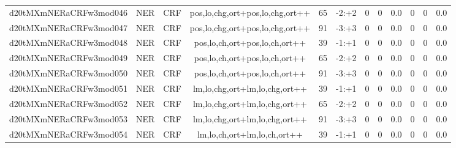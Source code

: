 \documentclass[a4paper]{article}
\begin{document}
\begin{landscape}
\begin{center}
\begin{tabular}{ |c|c|c|c|c|c|c|c|c|c|c|c|}
 
 	
 	\small{ d20tMXmNERaCRFw3mod046 } & \small{ NER} & \small{  CRF }  & pos,lo,chg,ort+pos,lo,chg,ort++  &  65 &  \small{  -2:+2 }  &  0 & 0 & 0.0  &  0 & 0 & 0.0 \\
 	

 
 	
 	\small{ d20tMXmNERaCRFw3mod047 } & \small{ NER} & \small{  CRF }  & pos,lo,chg,ort+pos,lo,chg,ort++  &  91 &  \small{  -3:+3 }  &  0 & 0 & 0.0  &  0 & 0 & 0.0 \\
 	

 
 	
 	\small{ d20tMXmNERaCRFw3mod048 } & \small{ NER} & \small{  CRF }  & pos,lo,ch,ort+pos,lo,ch,ort++  &  39 &  \small{  -1:+1 }  &  0 & 0 & 0.0  &  0 & 0 & 0.0 \\
 	

 
 	
 	\small{ d20tMXmNERaCRFw3mod049 } & \small{ NER} & \small{  CRF }  & pos,lo,ch,ort+pos,lo,ch,ort++  &  65 &  \small{  -2:+2 }  &  0 & 0 & 0.0  &  0 & 0 & 0.0 \\
 	

 
 	
 	\small{ d20tMXmNERaCRFw3mod050 } & \small{ NER} & \small{  CRF }  & pos,lo,ch,ort+pos,lo,ch,ort++  &  91 &  \small{  -3:+3 }  &  0 & 0 & 0.0  &  0 & 0 & 0.0 \\
 	

 
 	
 	\small{ d20tMXmNERaCRFw3mod051 } & \small{ NER} & \small{  CRF }  & lm,lo,chg,ort+lm,lo,chg,ort++  &  39 &  \small{  -1:+1 }  &  0 & 0 & 0.0  &  0 & 0 & 0.0 \\
 	

 
 	
 	\small{ d20tMXmNERaCRFw3mod052 } & \small{ NER} & \small{  CRF }  & lm,lo,chg,ort+lm,lo,chg,ort++  &  65 &  \small{  -2:+2 }  &  0 & 0 & 0.0  &  0 & 0 & 0.0 \\
 	

 
 	
 	\small{ d20tMXmNERaCRFw3mod053 } & \small{ NER} & \small{  CRF }  & lm,lo,chg,ort+lm,lo,chg,ort++  &  91 &  \small{  -3:+3 }  &  0 & 0 & 0.0  &  0 & 0 & 0.0 \\
 	

 
 	
 	\small{ d20tMXmNERaCRFw3mod054 } & \small{ NER} & \small{  CRF }  & lm,lo,ch,ort+lm,lo,ch,ort++  &  39 &  \small{  -1:+1 }  &  0 & 0 & 0.0  &  0 & 0 & 0.0 \\
 	


\end{tabular}
\end{center}
\end{landscape}
\end{document}
